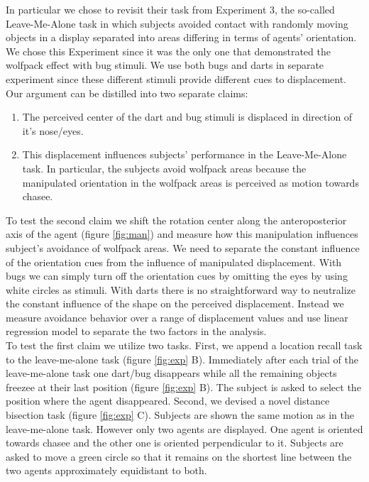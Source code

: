 \documentclass[10pt]{article}
\begin{document}
In particular we chose to revisit their task from Experiment 3, the so-called Leave-Me-Alone task in which subjects avoided contact with randomly moving objects in a display separated into areas differing in terms of agents' orientation. 
We chose this Experiment since it was the only one that demonstrated the wolfpack effect with bug stimuli. We use both bugs and darts in separate experiment since these different stimuli provide different cues to displacement.\\
Our argument can be distilled into two separate claims:
\begin{enumerate}
  \item The perceived center of the dart and bug stimuli is displaced in direction of it's nose/eyes.
  \item This displacement influences subjects' performance in the Leave-Me-Alone task. 
In particular, the subjects avoid wolfpack areas because the manipulated orientation in the wolfpack areas is perceived as motion towards chasee.
\end{enumerate}  
To test the second claim we shift the rotation center along the anteroposterior axis of the agent (figure \ref{fig:man}) and measure how this manipulation influences subject's avoidance of wolfpack areas. We need to separate the constant influence of the orientation cues from the influence of manipulated displacement. With bugs we can simply turn off the orientation cues by omitting the eyes by using white circles as stimuli. With darts there is no straightforward way to neutralize the constant influence of the shape on the perceived displacement. Instead we measure avoidance behavior over a range of displacement values and use linear regression model to separate the two factors in the analysis.\\
To test the first claim we utilize two tasks. 
First, we append a location recall task to the leave-me-alone task (figure \ref{fig:exp} B). 
Immediately after each trial of the leave-me-alone task one dart/bug disappears while all the remaining objects freezee at their last position (figure \ref{fig:exp} B). 
The subject is asked to select the position where the agent disappeared.
Second, we devised a novel distance bisection task (figure \ref{fig:exp} C). 
Subjects are shown the same motion as in the leave-me-alone task. 
However only two agents are displayed. 
One agent is oriented towards chasee and the other one is oriented perpendicular to it. 
Subjects are asked to move a green circle so that it remains on the shortest line between the two agents approximately equidistant to both. 
\end{document}
